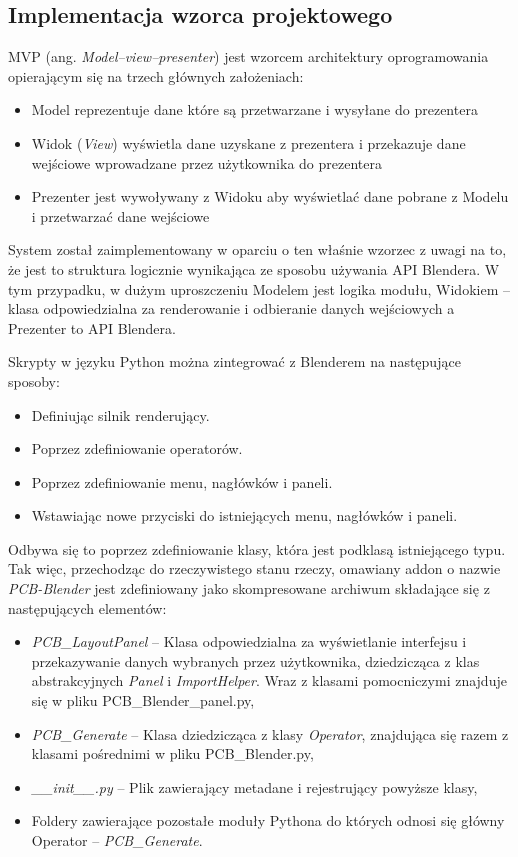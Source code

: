 \documentclass[brudnopis]{xmgr}
\begin{document}
\subsection{Implementacja wzorca projektowego} \label{mvp}
MVP (ang. \emph{Model–view–presenter}) jest wzorcem architektury oprogramowania opierającym się na trzech głównych założeniach\cite{mvp}:
\begin{itemize}
\item Model reprezentuje dane które są przetwarzane i wysyłane do prezentera
\item Widok (\emph{View}) wyświetla dane uzyskane z prezentera i przekazuje dane wejściowe wprowadzane przez użytkownika do prezentera
\item Prezenter jest wywoływany z Widoku aby wyświetlać dane pobrane z Modelu i przetwarzać dane wejściowe
\end{itemize}
System został zaimplementowany w oparciu o ten właśnie wzorzec z uwagi na to, że jest to struktura logicznie wynikająca ze sposobu używania API Blendera.
W tym przypadku, w dużym uproszczeniu Modelem jest logika modułu, Widokiem -- klasa odpowiedzialna za renderowanie i odbieranie danych wejściowych a Prezenter to API Blendera.
\newline


Skrypty w języku Python można zintegrować z Blenderem na następujące sposoby:
\begin{itemize}
\item Definiując silnik renderujący.
\item Poprzez zdefiniowanie operatorów.
\item Poprzez zdefiniowanie menu, nagłówków i paneli.
\item Wstawiając nowe przyciski do istniejących menu, nagłówków i paneli.
\end{itemize}

Odbywa się to poprzez zdefiniowanie klasy, która jest podklasą istniejącego typu.
Tak więc, przechodząc do rzeczywistego stanu rzeczy, omawiany addon o nazwie \emph{PCB-Blender} jest zdefiniowany jako skompresowane archiwum składające się z następujących elementów:
\begin{itemize}
\item \emph{PCB\_LayoutPanel} -- Klasa odpowiedzialna za wyświetlanie interfejsu i przekazywanie danych wybranych przez użytkownika, dziedzicząca z klas abstrakcyjnych \emph{Panel} i \emph{ImportHelper}. Wraz z klasami pomocniczymi znajduje się w pliku PCB\_Blender\_panel.py,
\item \emph{PCB\_Generate} -- Klasa dziedzicząca z klasy \emph{Operator}, znajdująca się razem z klasami pośrednimi w pliku PCB\_Blender.py,
\item \emph{\_\_init\_\_.py} -- Plik zawierający metadane i rejestrujący powyższe klasy,
\item Foldery zawierające pozostałe moduły Pythona do których odnosi się główny Operator -- \emph{PCB\_Generate}.
\end{itemize}
\end{document}
